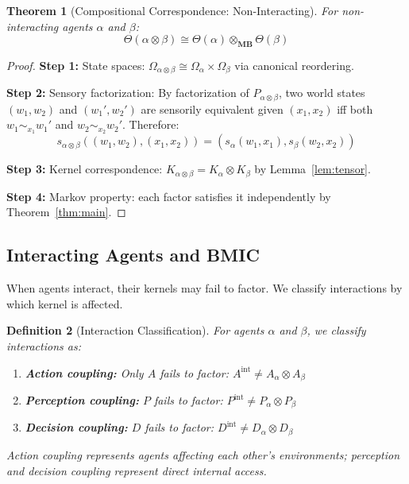 \documentclass[11pt,a4paper]{article}
\newtheorem{theorem}{Theorem}[section]
\newtheorem{definition}[theorem]{Definition}
\newcommand{\MB}{\mathbf{MB}}
\begin{document}
\begin{theorem}[Compositional Correspondence: Non-Interacting]\label{thm:comp-nonint}
For non-interacting agents $\alpha$ and $\beta$:
\[
\Theta(\alpha \otimes \beta) \cong \Theta(\alpha) \otimes_{\MB} \Theta(\beta)
\]
\end{theorem}

\begin{proof}
\textbf{Step 1:} State spaces: $\Omega_{\alpha \otimes \beta} \cong \Omega_\alpha \times \Omega_\beta$ via canonical reordering.

\textbf{Step 2:} Sensory factorization: By factorization of $P_{\alpha \otimes \beta}$, two world states $(w_1, w_2)$ and $(w_1', w_2')$ are sensorily equivalent given $(x_1, x_2)$ iff both $w_1 \sim_{x_1} w_1'$ and $w_2 \sim_{x_2} w_2'$. Therefore:
\[
s_{\alpha \otimes \beta}((w_1, w_2), (x_1, x_2)) = (s_\alpha(w_1, x_1), s_\beta(w_2, x_2))
\]

\textbf{Step 3:} Kernel correspondence: $K_{\alpha \otimes \beta} = K_\alpha \otimes K_\beta$ by Lemma~\ref{lem:tensor}.

\textbf{Step 4:} Markov property: each factor satisfies it independently by Theorem~\ref{thm:main}.
\end{proof}

\subsection{Interacting Agents and BMIC}

When agents interact, their kernels may fail to factor. We classify interactions by which kernel is affected.

\begin{definition}[Interaction Classification]\label{def:interaction}
For agents $\alpha$ and $\beta$, we classify interactions as:
\begin{enumerate}[nosep]
    \item \textbf{Action coupling:} Only $A$ fails to factor: $A^{\text{int}} \neq A_\alpha \otimes A_\beta$
    \item \textbf{Perception coupling:} $P$ fails to factor: $P^{\text{int}} \neq P_\alpha \otimes P_\beta$
    \item \textbf{Decision coupling:} $D$ fails to factor: $D^{\text{int}} \neq D_\alpha \otimes D_\beta$
\end{enumerate}
Action coupling represents agents affecting each other's environments; perception and decision coupling represent direct internal access.
\end{definition}
\end{document}
